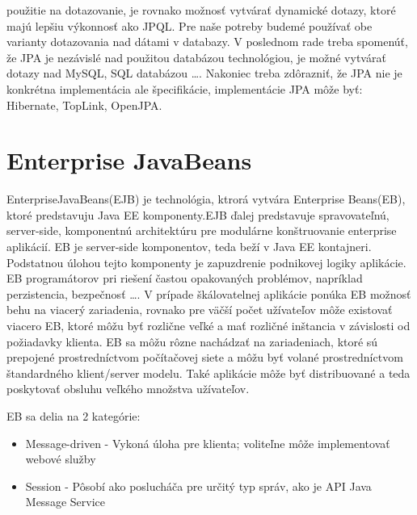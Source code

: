 použitie na dotazovanie, je rovnako možnosť vytvárať dynamické dotazy, ktoré majú lepšiu výkonnosť ako JPQL. Pre naše potreby budemé používať obe varianty dotazovania nad dátami v databazy. V poslednom rade treba spomenúť, že JPA je nezávislé nad použitou databázou technológiou, je možné vytvárať dotazy nad MySQL, SQL databázou \ldots. Nakoniec treba zdôrazniť, že JPA nie je konkrétna implementácia ale špecifikácie, implementácie JPA môže byť: Hibernate, TopLink, OpenJPA.


\section{Enterprise JavaBeans}
EnterpriseJavaBeans(EJB) je technológia, ktrorá vytvára Enterprise Beans(EB), ktoré predstavuju Java EE komponenty.EJB ďalej predstavuje spravovateľnú, server-side, komponentnú architektúru pre modulárne konštruovanie enterprise aplikácií. EB je server-side komponentov, teda beží v Java EE kontajneri. Podstatnou úlohou tejto komponenty je zapuzdrenie podnikovej logiky aplikácie. EB programátorov pri riešení častou opakovaných problémov, napríklad perzistencia, bezpečnosť \ldots. V prípade škálovatelnej aplikácie ponúka EB možnosť behu na viacerý zariadenia, rovnako pre väčší počet užívateľov môže existovať viacero EB, ktoré môžu byť rozlične veľké a mať rozličné inštancia v závislosti od požiadavky klienta. EB sa môžu rôzne nachádzať na zariadeniach, ktoré sú prepojené prostredníctvom počítačovej siete a môžu byť volané prostredníctvom štandardného klient/server modelu. Také aplikácie môže byť distribuované a teda poskytovať obsluhu veľkého množstva užívateľov.


EB sa delia na 2 kategórie:
\begin{itemize}
\item Message-driven - Vykoná úloha pre klienta; voliteľne môže implementovať webové služby
\item Session - Pôsobí ako poslucháča pre určitý typ správ, ako je API Java Message Service

\end{itemize}


